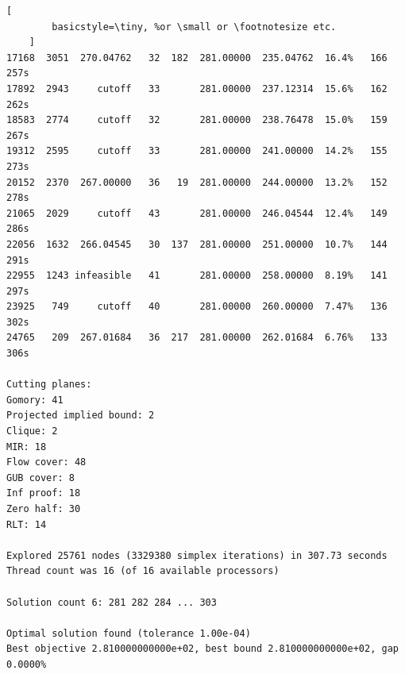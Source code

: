 \documentclass{article}
\begin{document}
\begin{lstlisting}[
        basicstyle=\tiny, %or \small or \footnotesize etc.
    ]
17168  3051  270.04762   32  182  281.00000  235.04762  16.4%   166  257s
17892  2943     cutoff   33       281.00000  237.12314  15.6%   162  262s
18583  2774     cutoff   32       281.00000  238.76478  15.0%   159  267s
19312  2595     cutoff   33       281.00000  241.00000  14.2%   155  273s
20152  2370  267.00000   36   19  281.00000  244.00000  13.2%   152  278s
21065  2029     cutoff   43       281.00000  246.04544  12.4%   149  286s
22056  1632  266.04545   30  137  281.00000  251.00000  10.7%   144  291s
22955  1243 infeasible   41       281.00000  258.00000  8.19%   141  297s
23925   749     cutoff   40       281.00000  260.00000  7.47%   136  302s
24765   209  267.01684   36  217  281.00000  262.01684  6.76%   133  306s

Cutting planes:
Gomory: 41
Projected implied bound: 2
Clique: 2
MIR: 18
Flow cover: 48
GUB cover: 8
Inf proof: 18
Zero half: 30
RLT: 14

Explored 25761 nodes (3329380 simplex iterations) in 307.73 seconds
Thread count was 16 (of 16 available processors)

Solution count 6: 281 282 284 ... 303

Optimal solution found (tolerance 1.00e-04)
Best objective 2.810000000000e+02, best bound 2.810000000000e+02, gap 0.0000%
    \end{lstlisting}
\end{document}
